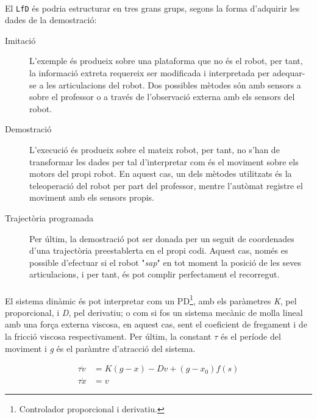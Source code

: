 \documentclass[12pt,a4paper,final,twoside]{article}
\begin{document}
\paragraph{}El \texttt{LfD} és podria estructurar en tres grans grups, segons la forma d'adquirir les dades de la demostració:
\begin{description}

\item[Imitació] L'exemple és produeix sobre una plataforma que no és el robot, per tant, la informació extreta requereix ser modificada i interpretada per adequar-se a les articulacions del robot. Dos possibles mètodes són amb sensors a sobre el professor o a través de l'observació externa amb els sensors del robot.

\item[Demostració] L'execució és produeix sobre el mateix robot, per tant, no s'han de transformar les dades per tal d'interpretar com és el moviment sobre els motors del propi robot. En aquest cas, un dels mètodes utilitzats és la teleoperació del robot per part del professor, mentre l'autòmat registre el moviment amb els sensors propis.

\item[Trajectòria programada] Per últim, la demostració pot ser donada per un seguit de coordenades d'una trajectòria preestablerta en el propi codi. Aquest cas, només es possible d'efectuar si el robot "\textit{sap}" en tot moment la posició de les seves articulacions, i per tant, és pot complir perfectament el recorregut. 

\end{description}

\paragraph{}El sistema dinàmic és pot interpretar com un PD\footnote{Controlador proporcional i derivatiu.}, amb els paràmetres \textit{K}, pel proporcional, i \textit{D}, pel derivatiu; o com si fos un sistema mecànic de molla lineal amb una força externa viscosa, en aquest cas, sent el coeficient de fregament i de la fricció viscosa respectivament. Per últim, la constant $\tau$ és el període del moviment i \textit{g} és el paràmtre d'atracció del sistema.

\begin{align}
\tau \dot{v} &= K(g - x) - Dv + (g - x_0)f(s)\label{eq:tau-v-dot-DMP}\\
\tau \dot{x} &= v\label{eq:tau-x-dot=v}
\end{align}
\end{document}
